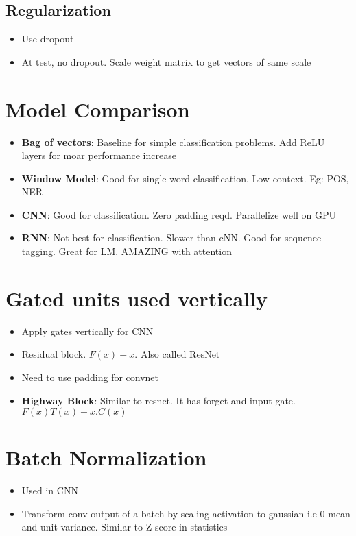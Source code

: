 \documentclass[a4paper]{article}
\begin{document}
\subsection{Regularization}
\begin{itemize}
    \item Use dropout
    \item At test, no dropout. Scale weight matrix to get vectors of same scale
\end{itemize}
\section{Model Comparison}
\begin{itemize}
    \item \textbf{Bag of vectors}: Baseline for simple classification problems. Add ReLU layers for moar performance increase
    \item \textbf{Window Model}: Good for single word classification. Low context. Eg: POS, NER 
    \item \textbf{CNN}: Good for classification. Zero padding reqd. Parallelize well on GPU
    \item \textbf{RNN}: Not best for classification. Slower than cNN. Good for sequence tagging. Great for LM. AMAZING with attention  
\end{itemize}
\section{Gated units used vertically}
\begin{itemize}
    \item Apply gates vertically for CNN
    \item Residual block. $F(x) + x$. Also called ResNet
    \item Need to use padding for convnet
    \item \textbf{Highway Block}: Similar to resnet. It has forget and input gate. $F(x)T(x) + x.C(x)$ 
\end{itemize}
\section{Batch Normalization}
\begin{itemize}
    \item Used in CNN
    \item Transform conv output of a batch by scaling activation to gaussian i.e 0 mean and unit variance. Similar to Z-score in statistics
\end{itemize}
\end{document}
